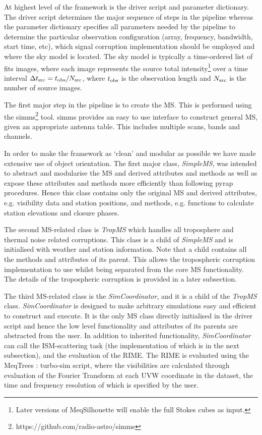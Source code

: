 At highest level of the framework is the driver script and parameter dictionary. The driver script determines the major sequence of steps in the pipeline whereas the parameter dictionary specifies all parameters needed by the pipeline to determine the particular observation configuration (array, frequency, bandwidth, start time, etc), which signal corruption implementation should be employed and where the sky model is located. The sky model is typically a time-ordered list of {\sc fits} images, where each image represents the source total intensity\footnote{Later versions of {\sc MeqSilhouette} will enable the full Stokes cubes as input.} over a time interval $\Delta t_{\rm src} = t_{\rm obs}/N_{\rm src}$, where $t_{\rm obs}$ is the observation length and $N_{\rm src}$ is the number of source images.


The first major step in the pipeline is to create the MS. This is performed using the {\sc simms}\footnote{https://github.com/radio-astro/simms} tool. {\sc simms} provides an easy to use interface to construct general MS, given an appropriate antenna table. This includes multiple scans, bands and channels. 

In order to make the framework as `clean' and  modular as possible we have made extensive use of object orientation. The first major class, \emph{SimpleMS}, was intended to abstract and modularise the MS and derived attributes and methods as well as expose these attributes and methods more efficiently than following {\sc pyrap} procedures. Hence this class contains only the original MS and derived attributes, e.g. visibility data and station positions, and methods, e.g. functions to calculate station elevations and closure phases.

The second MS-related class is \emph{TropMS} which handles all troposphere and thermal noise related corruptions. This class is a child of {\it SimpleMS} and is initialised with weather and station information. Note that a child contains all the methods and attributes of its parent. This allows the tropospheric corruption implementation to use whilst being separated from the core MS functionality. The details of the tropospheric corruption is provided in a later subsection.

The third MS-related class is the \emph{SimCoordinator}, and it is a child of the {\it TropMS} class. {\it SimCoordinator} is designed to make arbitrary simulations easy and efficient to construct and execute. It is the only MS class directly initialised in the driver script and hence the low level functionality and attributes of its parents are abstracted from the user. In addition to inherited functionality, {\it SimCoordinator} can call the ISM-scattering task (the implementation of which is in the next subsection), and the evaluation of the RIME. The RIME is evaluated using the MeqTrees : turbo-sim script, where the visibilities are calculated through evaluation of the Fourier Transform at each UVW coordinate in the dataset, the time and frequency resolution of which is specified by the user.
 
